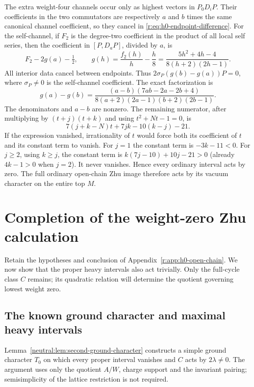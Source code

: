 \documentclass[11pt,a4paper]{article}
\numberwithin{equation}{section}
\theoremstyle{definition}\newtheorem{definition}[theorem]{Definition}
\theoremstyle{remark}\newtheorem{remark}[theorem]{Remark}
\begin{document}
The extra weight-four channels occur only as highest vectors in
$P_0D_iP$.  Their coefficients in the two commutators are respectively
$a$ and $b$ times the same canonical channel coefficient, so they cancel
in \eqref{r:eq:h0-endpoint-difference}.  For the self-channel, if $F_2$ is
the degree-two coefficient in the product of all local self series, then
the coefficient in $[P,D_aP]$, divided by $a$, is
\[
 F_2-2g(a)-\tfrac12,\qquad
 g(h)=\frac{f_2(h)}h-\frac h8
     =\frac{5h^2+4h-4}{8(h+2)(2h-1)}.
\]
All interior data cancel between endpoints.  Thus
$2\sigma_P(g(b)-g(a))P=0$, where $\sigma_P\ne0$ is the self-channel
coefficient.  The exact factorization is
\[
 g(a)-g(b)=
 \frac{(a-b)(7ab-2a-2b+4)}
 {8(a+2)(2a-1)(b+2)(2b-1)}.
\]
The denominators and $a-b$ are nonzero.  The remaining numerator,
after multiplying by $(t+j)(t+k)$ and using $t^2+Nt-1=0$, is
\[
 7(j+k-N)t+7jk-10(k-j)-21.
\]
If the expression vanished, irrationality of $t$ would force both
its coefficient of $t$ and its constant term to vanish. For $j=1$
the constant term is $-3k-11<0$. For $j\geq2$, using $k\geq j$,
the constant term is $k(7j-10)+10j-21>0$ (already $4k-1>0$
when $j=2$). It never vanishes. Hence every ordinary interval
acts by zero.  The full ordinary open-chain Zhu image therefore acts by
its vacuum character on the entire top $M$.


\section{Completion of the weight-zero Zhu calculation}
\label{r:app:h0-completion}

Retain the hypotheses and conclusion of Appendix~\ref{r:app:h0-open-chain}.
We now show that the proper heavy intervals also act trivially.
Only the full-cycle class $C$ remains; its quadratic relation will
determine the quotient governing lowest weight zero.

\subsection{The known ground character and maximal heavy intervals}

Lemma~\ref{neutral:lem:second-ground-character} constructs a simple
ground character $T_0$ on which every proper interval vanishes and $C$
acts by $2\lambda\ne0$.  The argument uses only the quotient $A/W$,
charge support and the invariant pairing; semisimplicity of the lattice
restriction is not required.
\end{document}
